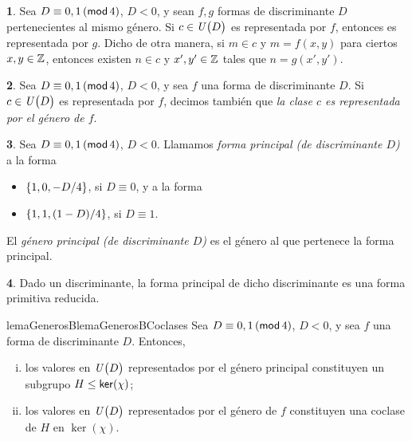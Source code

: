\theoremstyle{plain}
\newtheorem{teoGenerosB}{\teoname}[section]
\newtheorem{lemaGenerosB}[teoGenerosB]{\lemaname}
\newtheorem{coroGenerosB}[teoGenerosB]{\coroname}

\theoremstyle{definition}
\newtheorem{obsGenerosB}[teoGenerosB]{\obsname}
\newtheorem{defGenerosB}[teoGenerosB]{}


\begin{obsGenerosB}\label{obs:generos:representacion}
	Sea $D\equiv 0,1\tmodulo[4]$, $D<0$, y sean $f,g$ formas
	de discriminante $D$ pertenecientes al mismo g\'enero.
	Si $c\in\Unidadesmod[D]$ es representada por $f$, entonces
	es representada por $g$. Dicho de otra manera, si
	$m\in c$ y $m=f(x,y)$ para ciertos $x,y\in\Enteros$, entonces
	existen $n\in c$ y $x',y'\in\Enteros$ tales que
	$n=g(x',y')$.
\end{obsGenerosB}

\begin{defGenerosB}\label{def:generos:representacion}
	Sea $D\equiv 0,1\tmodulo[4]$, $D<0$, y sea $f$ una forma
	de discriminante $D$. Si $c\in\Unidadesmod[D]$ es
	representada por $f$, decimos tambi\'en que
	\emph{la clase $c$ es representada por el g\'enero de $f$}.
\end{defGenerosB}

\begin{defGenerosB}\label{def:generos:principal}
	Sea $D\equiv 0,1\tmodulo[4]$, $D<0$. Llamamos
	\emph{forma principal (de discriminante $D$)} a la forma
	\begin{itemize}
		\item $\binaria{1,0,-D/4}$, si $D\equiv 0$, y a la forma
		\item $\binaria{1,1,(1-D)/4}$, si $D\equiv 1$.
	\end{itemize}
	El \emph{g\'enero principal (de discriminante $D$)} es el
	g\'enero al que pertenece la forma principal.
\end{defGenerosB}

\begin{obsGenerosB}\label{obs:generos:principal}
	Dado un discriminante, la forma principal de dicho discriminante
	es una forma primitiva reducida.
\end{obsGenerosB}

\begin{restatable}{lemaGenerosB}{lemaGenerosBCoclases}
	\label{lema:generos}
	Sea $D\equiv 0,1\tmodulo[4]$, $D<0$, y sea $f$ una forma
	de discriminante $D$. Entonces,
	\begin{enumerate}[(i)]
		\item\label{item:lema:generos:principal}
			los valores en $\Unidadesmod[D]$ representados por
			el g\'enero principal constituyen un subgrupo
			$H\subgrpeq\ker(\chi)$;
		\item\label{item:lema:generos:coclases}
			los valores en $\Unidadesmod[D]$ representados por
			el g\'enero de $f$ constituyen una coclase de $H$
			en $\ker(\chi)$.
	\end{enumerate}
\end{restatable}

